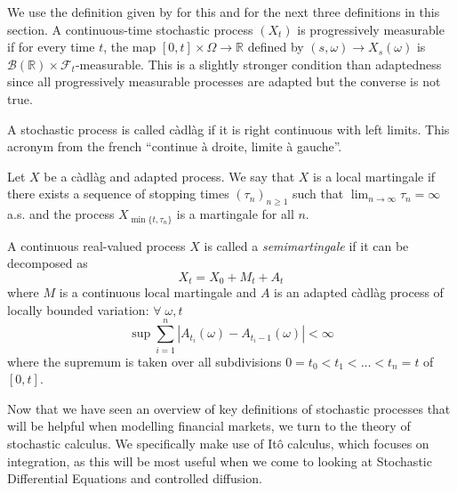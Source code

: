 \begin{definition}
    We use the definition given by \textcite{Pham} for this and for the next 
    three definitions in this section.
    A continuous-time stochastic process $(X_t)$ is progressively measurable if
    for every time $t$, the map $[0,t]\times\Omega\rightarrow\mathbb{R}$ defined
    by $(s,\omega)\rightarrow X_s(\omega)$ is $\mathcal{B}(\mathbb{R})\times\mathcal{F}_t$-measurable.
    This is a slightly stronger condition than adaptedness since all progressively
    measurable processes are adapted but the converse is not true. 
\end{definition}

\begin{definition}[C\`{a}dl\`{a}g process]
    A stochastic process is called c\`{a}dl\`{a}g if it is right continuous with left 
    limits. This acronym from the french ``continue \`{a} droite, limite \`{a} gauche''.
\end{definition}

\begin{definition}
    Let $X$ be a c\`{a}dl\`{a}g and adapted process. We say that $X$ is a local martingale
    if there exists a sequence of stopping times $(\tau_n)_{n\geq1}$ such that 
    $\lim_{n\rightarrow\infty}\tau_n=\infty$ a.s. and the process $X_{\min\{t,\tau_n\}}$
    is a martingale for all $n$.
\end{definition}

\begin{definition}[Semimartingale]
    A continuous real-valued process $X$ is called a \emph{semimartingale} if it can 
    be decomposed as
    \begin{equation}
        X_t = X_0 + M_t + A_t
    \end{equation}
    where $M$ is a continuous local martingale and $A$ is an adapted c\`{a}dl\`{a}g 
    process of locally bounded variation: $\forall\;\omega,t$
    \begin{equation*}
        \sup\sum_{i=1}^n|A_{t_i}(\omega)-A_{t_i-1}(\omega)|<\infty
    \end{equation*}
    where the supremum is taken over all subdivisions $0=t_0<t_1<\dots<t_n=t$ of 
    $[0,t]$.
\end{definition}

Now that we have seen an overview of key definitions of stochastic processes 
that will be helpful when modelling financial markets, we turn to the 
theory of stochastic calculus. We specifically make use of It\^{o} calculus, 
which focuses on integration, as this will be most useful when we come to looking 
at Stochastic Differential Equations and controlled diffusion.

